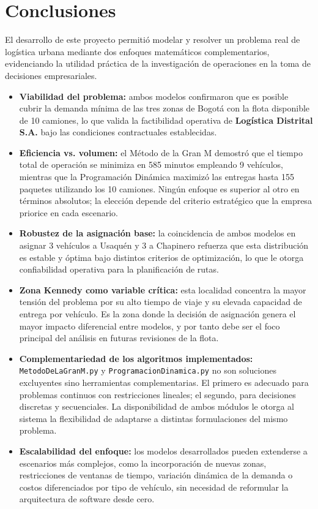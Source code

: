 \documentclass[12pt]{article}
\begin{document}
\section{Conclusiones}

El desarrollo de este proyecto permitió modelar y resolver un problema real de logística urbana mediante dos enfoques matemáticos complementarios, evidenciando la utilidad práctica de la investigación de operaciones en la toma de decisiones empresariales.

\begin{itemize}
	\item \textbf{Viabilidad del problema:} ambos modelos confirmaron que es posible cubrir la demanda mínima de las tres zonas de Bogotá con la flota disponible de 10 camiones, lo que valida la factibilidad operativa de \textbf{Logística Distrital S.A.} bajo las condiciones contractuales establecidas.
	
	\item \textbf{Eficiencia vs. volumen:} el Método de la Gran M demostró que el tiempo total de operación se minimiza en 585 minutos empleando 9 vehículos, mientras que la Programación Dinámica maximizó las entregas hasta 155 paquetes utilizando los 10 camiones. Ningún enfoque es superior al otro en términos absolutos; la elección depende del criterio estratégico que la empresa priorice en cada escenario.
	
	\item \textbf{Robustez de la asignación base:} la coincidencia de ambos modelos en asignar 3 vehículos a Usaquén y 3 a Chapinero refuerza que esta distribución es estable y óptima bajo distintos criterios de optimización, lo que le otorga confiabilidad operativa para la planificación de rutas.
	
	\item \textbf{Zona Kennedy como variable crítica:} esta localidad concentra la mayor tensión del problema por su alto tiempo de viaje y su elevada capacidad de entrega por vehículo. Es la zona donde la decisión de asignación genera el mayor impacto diferencial entre modelos, y por tanto debe ser el foco principal del análisis en futuras revisiones de la flota.
	
	\item \textbf{Complementariedad de los algoritmos implementados:} \texttt{MetodoDeLaGranM.py} y \texttt{ProgramacionDinamica.py} no son soluciones excluyentes sino herramientas complementarias. El primero es adecuado para problemas continuos con restricciones lineales; el segundo, para decisiones discretas y secuenciales. La disponibilidad de ambos módulos le otorga al sistema la flexibilidad de adaptarse a distintas formulaciones del mismo problema.
	
	\item \textbf{Escalabilidad del enfoque:} los modelos desarrollados pueden extenderse a escenarios más complejos, como la incorporación de nuevas zonas, restricciones de ventanas de tiempo, variación dinámica de la demanda o costos diferenciados por tipo de vehículo, sin necesidad de reformular la arquitectura de software desde cero.
\end{itemize}
\end{document}
